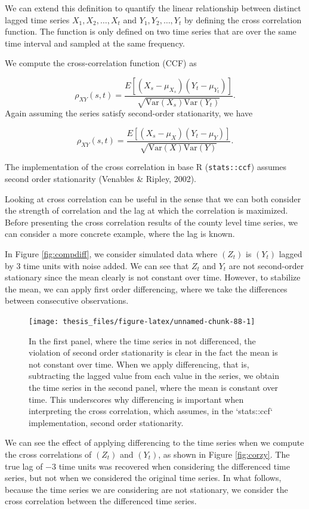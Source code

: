 \documentclass[12pt,twoside]{smiththesis}
\begin{document}
We can extend this definition to quantify the linear relationship between distinct lagged time series \(X_1, X_2, \dots, X_t\) and \(Y_1, Y_2, \dots, Y_t\) by defining the cross correlation function. The function is only defined on two time series that are over the same time interval and sampled at the same frequency.
\begin{tcolorbox}[title=Definition: Cross-Correlation]

We compute the cross-correlation function (CCF) as

$$\rho_{XY}(s,t) = \dfrac{E[(X_s - \mu_{X_s})(Y_t-\mu_{Y_t})]}{\sqrt{\text{Var}(X_s) \text{Var}(Y_t)}}.$$
Again assuming the series satisfy second-order stationarity, we have

$$\rho_{XY}(s,t) = \dfrac{E[(X_s - \mu_{X})(Y_t-\mu_{Y})]}{\sqrt{\text{Var}(X) \text{Var}(Y)}}.$$

\end{tcolorbox}
The implementation of the cross correlation in base R (\texttt{stats::ccf}) assumes second order stationarity (Venables \& Ripley, 2002).

Looking at cross correlation can be useful in the sense that we can both consider the strength of correlation and the lag at which the correlation is maximized. Before presenting the cross correlation results of the county level time series, we can consider a more concrete example, where the lag is known.

In Figure \ref{fig:compdiff}, we consider simulated data where \((Z_t)\) is \((Y_t)\) lagged by 3 time units with noise added. We can see that \(Z_t\) and \(Y_t\) are not second-order stationary since the mean clearly is not constant over time. However, to stabilize the mean, we can apply first order differencing, where we take the differences between consecutive observations.
\begin{figure}
\texttt{[image: thesis\_files/figure-latex/unnamed-chunk-88-1]} \caption{\label{fig:compdiff}In the first panel, where the time series in not differenced, the violation of second order stationarity is clear in the fact the mean is not constant over time. When we apply differencing, that is, subtracting the lagged value from each value in the series, we obtain the time series in the second panel, where the mean is constant over time. This underscores why differencing is important when interpreting the cross correlation, which assumes, in the `stats::ccf` implementation, second order stationarity.}\label{fig:unnamed-chunk-88}
\end{figure}
We can see the effect of applying differencing to the time series when we compute the cross correlations of \((Z_t)\) and \((Y_t)\), as shown in Figure \ref{fig:corzy}. The true lag of \(-3\) time units was recovered when considering the differenced time series, but not when we considered the original time series. In what follows, because the time series we are considering are not stationary, we consider the cross correlation between the differenced time series.
\end{document}

